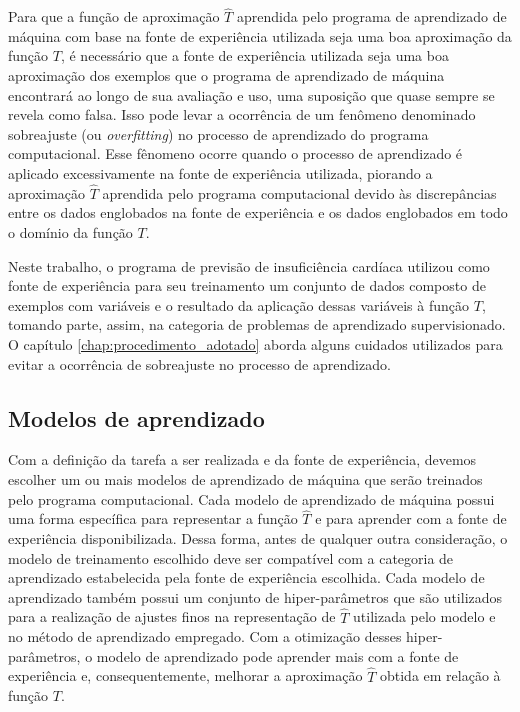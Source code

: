 Para que a função de aproximação $\hat{T}$ aprendida pelo programa de aprendizado de máquina com base na fonte de experiência utilizada seja uma boa aproximação da função $T$, é necessário que a fonte de experiência utilizada seja uma boa aproximação dos exemplos que o programa de aprendizado de máquina encontrará ao longo de sua avaliação e uso, uma suposição que quase sempre se revela como falsa\cite[p.6]{machine_learning}. Isso pode levar a ocorrência de um fenômeno denominado sobreajuste (ou \textit{overfitting}) no processo de aprendizado do programa computacional. Esse fênomeno ocorre quando o processo de aprendizado é aplicado excessivamente na fonte de experiência utilizada, piorando a aproximação $\hat{T}$ aprendida pelo programa computacional devido às discrepâncias entre os dados englobados na fonte de experiência e os dados englobados em todo o domínio da função $T$.

Neste trabalho, o programa de previsão de insuficiência cardíaca utilizou como fonte de experiência para seu treinamento um conjunto de dados\cite{larxel_dataset} composto de exemplos com variáveis e o resultado da aplicação dessas variáveis à função $T$, tomando parte, assim, na categoria de problemas de aprendizado supervisionado. O capítulo \ref{chap:procedimento_adotado} aborda alguns cuidados utilizados para evitar a ocorrência de sobreajuste no processo de aprendizado.

\subsection{Modelos de aprendizado}

Com a definição da tarefa a ser realizada e da fonte de experiência, devemos escolher um ou mais modelos de aprendizado de máquina que serão treinados pelo programa computacional. Cada modelo de aprendizado de máquina possui uma forma específica para representar a função $\hat{T}$ e para aprender com a fonte de experiência disponibilizada. Dessa forma, antes de qualquer outra consideração, o modelo de treinamento escolhido deve ser compatível com a categoria de aprendizado estabelecida pela fonte de experiência escolhida. Cada modelo de aprendizado também possui um conjunto de hiper-parâmetros que são utilizados para a realização de ajustes finos na representação de $\hat{T}$ utilizada pelo modelo e no método de aprendizado empregado. Com a otimização desses hiper-parâmetros, o modelo de aprendizado pode aprender mais com a fonte de experiência e, consequentemente, melhorar a aproximação $\hat{T}$ obtida em relação à função $T$.

